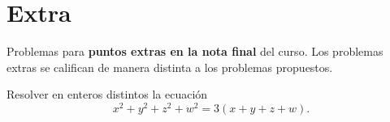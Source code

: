 \section{Extra}

Problemas para \textbf{puntos extras en la nota final} del curso.
Los problemas extras se califican de manera distinta a los problemas propuestos.

\begin{problem}
    Resolver en enteros distintos la ecuación
    \[
        x^2 + y^2 + z^2 + w^2 = 3(x + y + z + w).
    \]
\end{problem}